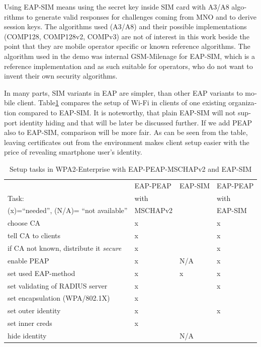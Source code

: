 \documentclass[12pt,a4paper,english]{tutthesis}
\begin{document}
\begin{otherlanguage}{english}
  Using EAP-SIM means using the secret key inside SIM card with A3/A8
algorithms to generate valid responses for challenges coming from MNO
and to derive session keys.  The algorithms used (A3/A8) and their
possible implementations (COMP128, COMP128v2, COMPv3) are not of
interest in this work beside the point that they are mobile operator
specific or known reference algorithms.
The algorithm used in the demo was internal GSM-Milenage for EAP-SIM,
which is a reference implementation and as such suitable for operators, who do not 
want to invent their own security algorithms. 


In many parts, SIM variants in EAP are simpler, than other EAP
variants to mobile client.  Table\ref{table-peapsim} compares the setup of Wi-Fi
in clients of one existing organization compared to EAP-SIM. It
is noteworthy, that plain EAP-SIM will not support identity hiding and
that will be later be discussed further. If we add PEAP \cite{peap}
also to EAP-SIM, comparison will be more fair.
As can be seen from the table, leaving certificates out from the environment
makes client setup easier with the price of revealing smartphone user's
identity.  



\begin{table}[htb]
\caption{\label{table-peapsim}Setup tasks in  WPA2-Enterprise with EAP-PEAP-MSCHAPv2 and EAP-SIM}
\centering
\begin{tabular}{llll}
 & EAP-PEAP & EAP-SIM & EAP-PEAP\\
Task: & with &  & with\\
(x)=``needed'', (N/A)= ``not available'' & MSCHAPv2 &  & EAP-SIM\\
\hline
choose CA & x &  & x\\
tell CA to clients & x &  & x\\
if CA not known, distribute it \emph{secure} & x &  & x\\
enable PEAP & x & N/A & x\\
set used EAP-method & x & x & x\\
set validating of RADIUS server & x &  & x\\
set encapsulation (WPA/802.1X) & x &  & \\
set outer identity & x &  & x\\
set inner creds & x &  & \\
hide identity &  & N/A & \\
\hline
\end{tabular}
\end{table}






\end{otherlanguage}
\end{document}
